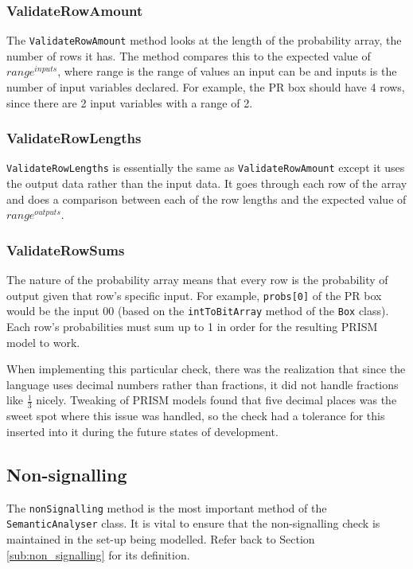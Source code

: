 \documentclass[report.tex]{subfiles}
\begin{document}
\subsubsection{ValidateRowAmount} %
\label{ssub:validaterowamount}
The \texttt{ValidateRowAmount} method looks at the length of the probability
array, the number of rows it has. The method compares this to the expected
value of \(range ^{inputs}\), where range is the range of values an input can be
and inputs is the number of input variables declared. For example, the PR box
should have 4 rows, since there are 2 input variables with a range of 2.

\subsubsection{ValidateRowLengths} %
\label{ssub:validaterowlengths}
\texttt{ValidateRowLengths} is essentially the same as 
\texttt{ValidateRowAmount} except it uses the output data rather than the input
data. It goes through each row of the array and does a comparison between each
of the row lengths and the expected value of \(range ^{outputs}\).

\subsubsection{ValidateRowSums} %
\label{ssub:validaterowsums}
The nature of the probability array means that every row is the probability of
output given that row's specific input. For example, \texttt{probs[0]} of the
PR box would be the input 00 (based on the \texttt{intToBitArray} method of the
\texttt{Box} class). Each row's probabilities must sum up to 1 in order for the
resulting PRISM model to work.

When implementing this particular check, there was the realization that since
the language uses decimal numbers rather than fractions, it did not handle
fractions like \(\frac{1}{3}\) nicely. Tweaking of PRISM models found that five
decimal places was the sweet spot where this issue was handled, so the check
had a tolerance for this inserted into it during the future states of
development.

\subsection{Non-signalling} %
\label{sub:non_signalling_impl}
The \texttt{nonSignalling} method is the most important method of the
\texttt{SemanticAnalyser} class. It is vital to ensure that the non-signalling
check is maintained in the set-up being modelled. Refer back to Section
\ref{sub:non_signalling} for its definition.
\end{document}
